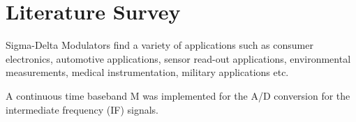 \chapter{Literature Survey}\label{literature_survey}

Sigma-Delta Modulators find a variety of applications such as consumer electronics, automotive applications, sensor read-out applications, environmental measurements, medical instrumentation, military applications etc. 



A continuous time baseband {\textSigma}{\textDelta}M \cite{breems20001} was implemented for the A/D conversion for the intermediate frequency (IF) signals.

\cite{breems20001} \cite{fujimori200090} \cite{morizio200014} \cite{rosa2000cmos}


